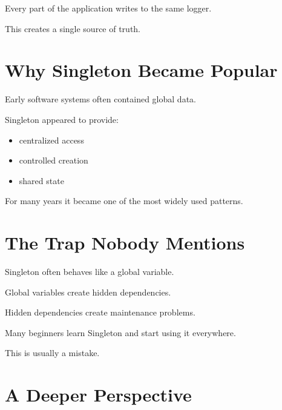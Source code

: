 \documentclass[11pt,a4paper]{book}
\begin{document}
Every part of the application writes to the same
logger.

This creates a single source of truth.


\section{Why Singleton Became Popular}

Early software systems often contained global data.

Singleton appeared to provide:

\begin{itemize}

\item centralized access
\item controlled creation
\item shared state

\end{itemize}

For many years it became one of the most widely used
patterns.


\section{The Trap Nobody Mentions}

\begin{trap}

Singleton often behaves like a global variable.

Global variables create hidden dependencies.

Hidden dependencies create maintenance problems.

\end{trap}

\begin{idea}

Many beginners learn Singleton and start using it
everywhere.

This is usually a mistake.

\end{idea}


\section{A Deeper Perspective}
\end{document}
